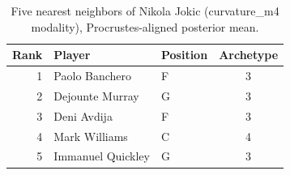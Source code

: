 \begin{table}[htbp]
  \centering\small
  \begin{tabular}{rllc}
    \toprule
    Rank & Player & Position & Archetype \\
    \midrule
    1 & Paolo Banchero & F & 3 \\
    2 & Dejounte Murray & G & 3 \\
    3 & Deni Avdija & F & 3 \\
    4 & Mark Williams & C & 4 \\
    5 & Immanuel Quickley & G & 3 \\
    \bottomrule
  \end{tabular}
  \caption{Five nearest neighbors of Nikola Jokic (curvature_m4 modality), Procrustes-aligned posterior mean.}
  \label{tab:Nikola_Jokic_neighbors_curvature_m4}
\end{table}

